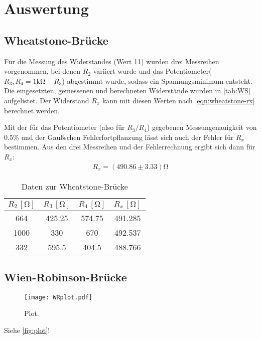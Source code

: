 \section{Auswertung}
\label{sec:Auswertung}

\subsection{Wheatstone-Brücke}
Für die Messung des Widerstandes (Wert 11) wurden drei Messreihen vorgenommen, bei denen $R_2$ variiert wurde und das Potentiometer($R_3, R_4=1\si{\kilo}\si{\ohm}-R_3$) abgestimmt wurde, sodass ein Spannungsminimum entsteht. Die eingesetzten, gemessenen und berechneten  Widerstände wurden in \autoref{tab:WS} aufgelistet. Der Widerstand $R_x$ kann mit diesen Werten nach \autoref{eqn:wheatstone-rx} berechnet werden.

Mit der für das Potentiometer (also für $R_3/R_4$) gegebenen Messungenauigkeit von $0.5\%$ und der Gaußschen Fehlerfortpflanzung lässt sich auch der Fehler für $R_x$ bestimmen. Aus den drei Messreihen und der Fehlerrechnung ergibt sich dann 
für $R_x$:
\begin{align}
  R_x=(490.86 \pm 3.33)\si{\ohm}
\end{align}

\begin{table}
  \centering
  \caption{Daten zur Wheatstone-Brücke}
  \label{tab:WS}
  \begin{tabular}{c c c c}
  \toprule
  $R_2 \, [\si{\ohm}]$ &$R_3 \, [\si{\ohm}]$ &$R_4 \, [\si{\ohm}]$ & $R_x \, [\si{\ohm}]$\\
  \midrule
   664 & 425.25 & 574.75& 491.285\\
   1000 & 330 & 670 & 492.537 \\
   332 & 595.5 & 404.5 & 488.766 \\
  \bottomrule
  \end{tabular}
\end{table}


\subsection{Wien-Robinson-Brücke}
\begin{figure}
  \centering
  \texttt{[image: WRplot.pdf]}
  \caption{Plot.}
  \label{fig:plot}
\end{figure}


Siehe \autoref{fig:plot}!
